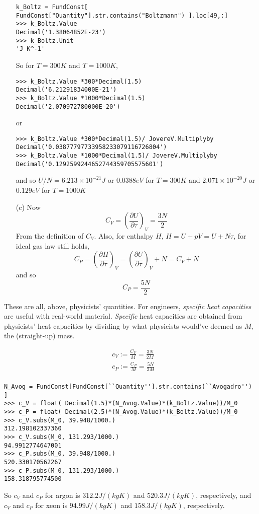 \documentclass[10pt]{amsart}
\begin{document}
\begin{multicols*}{2}
\begin{enumerate}
\begin{lstlisting}
k_Boltz = FundConst[ FundConst["Quantity"].str.contains("Boltzmann") ].loc[49,:]
>>> k_Boltz.Value
Decimal('1.38064852E-23')
>>> k_Boltz.Unit
'J K^-1'
\end{lstlisting}
So for $T=300K$ and $T=1000K$,
\begin{lstlisting}
>>> k_Boltz.Value *300*Decimal(1.5)
Decimal('6.21291834000E-21')
>>> k_Boltz.Value *1000*Decimal(1.5)
Decimal('2.070972780000E-20')
\end{lstlisting}
or 
\begin{lstlisting}
>>> k_Boltz.Value *300*Decimal(1.5)/ JovereV.Multiplyby
Decimal('0.03877797733958233079116726804')
>>> k_Boltz.Value *1000*Decimal(1.5)/ JovereV.Multiplyby
Decimal('0.1292599244652744359705575601')
\end{lstlisting}
and so $U/N = 6.213 \times 10^{-21} J$ or $0.0388 eV$ for $T=300K$ and $2.071 \times 10^{-20}J$ or $0.129 eV$ for $T=1000K$ 
\item[(c)] Now
\[
C_V = \left( \frac{ \partial U}{ \partial \tau} \right)_V = \frac{3N}{2}
\]
From the definition of $C_V$.  Also, for enthalpy $H$, $H = U+pV = U+N\tau$, for ideal gas law still holds,
\[
C_P = \left( \frac{ \partial H}{ \partial \tau} \right)_V = \left( \frac{ \partial U }{ \partial \tau} \right)_V + N = C_V + N 
\]
and so 
\[
C_P = \frac{5N}{2}
\]
\end{enumerate}

These are all, above, physicists' quantities.  For engineers, \emph{specific heat capacities} are useful with real-world material.  \emph{Specific} heat capacities are obtained from physicists' heat capacities by dividing by what physicists would've deemed as $M$, the (straight-up) mass.  

\[
\begin{aligned}
  & c_V := \frac{C_V}{M} = \frac{3N}{2M} \\ 
  & c_P := \frac{C_P}{M} = \frac{5N}{2M} \\ 
\end{aligned}
\]
\begin{lstlisting}
N_Avog = FundConst[FundConst[``Quantity''].str.contains(``Avogadro'') ]
>>> c_V = float( Decimal(1.5)*(N_Avog.Value)*(k_Boltz.Value))/M_0
>>> c_P = float( Decimal(2.5)*(N_Avog.Value)*(k_Boltz.Value))/M_0
>>> c_V.subs(M_0, 39.948/1000.)
312.198102337360
>>> c_V.subs(M_0, 131.293/1000.)
94.9912774647001
>>> c_P.subs(M_0, 39.948/1000.)
520.330170562267
>>> c_P.subs(M_0, 131.293/1000.)
158.318795774500
\end{lstlisting}
So $c_V$ and $c_P$ for argon is $312.2 J/(kg K)$ and $520.3 J/(kg K)$, respectively, and $c_V$ and $c_P$ for xeon is $94.99 J/(kg K)$ and $158.3 J/(kg K)$, respectively.  


\end{multicols*}
\end{document}
